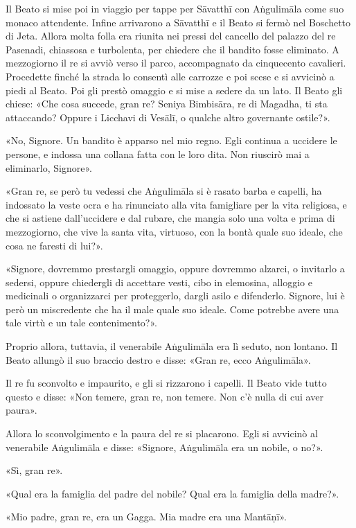 Il Beato si mise poi in viaggio per tappe per Sāvatthī con Aṅgulimāla come suo
monaco attendente. Infine arrivarono a Sāvatthī e il Beato si fermò nel
Boschetto di Jeta. Allora molta folla era riunita nei pressi del cancello del
palazzo del re Pasenadi, chiassosa e turbolenta, per chiedere che il bandito
fosse eliminato. A mezzogiorno il re si avviò verso il parco, accompagnato da
cinquecento cavalieri. Procedette finché la strada lo consentì alle carrozze e
poi scese e si avvicinò a piedi al Beato. Poi gli prestò omaggio e si mise a
sedere da un lato. Il Beato gli chiese: «Che cosa succede, gran re? Seniya
Bimbisāra, re di Magadha, ti sta attaccando? Oppure i Licchavi di Vesālī, o
qualche altro governante ostile?».

«No, Signore. Un bandito è apparso nel mio regno. Egli continua a uccidere le
persone, e indossa una collana fatta con le loro dita. Non riuscirò mai a
eliminarlo, Signore».

«Gran re, se però tu vedessi che Aṅgulimāla si è rasato barba e capelli, ha
indossato la veste ocra e ha rinunciato alla vita famigliare per la vita
religiosa, e che si astiene dall’uccidere e dal rubare, che mangia solo una
volta e prima di mezzogiorno, che vive la santa vita, virtuoso, con la bontà
quale suo ideale, che cosa ne faresti di lui?».

«Signore, dovremmo prestargli omaggio, oppure dovremmo alzarci, o invitarlo a
sedersi, oppure chiedergli di accettare vesti, cibo in elemosina, alloggio e
medicinali o organizzarci per proteggerlo, dargli asilo e difenderlo. Signore,
lui è però un miscredente che ha il male quale suo ideale. Come potrebbe avere
una tale virtù e un tale contenimento?».

Proprio allora, tuttavia, il venerabile Aṅgulimāla era lì seduto, non lontano.
Il Beato allungò il suo braccio destro e disse: «Gran re, ecco Aṅgulimāla».

Il re fu sconvolto e impaurito, e gli si rizzarono i capelli. Il Beato vide
tutto questo e disse: «Non temere, gran re, non temere. Non c’è nulla di cui
aver paura».

Allora lo sconvolgimento e la paura del re si placarono. Egli si avvicinò al
venerabile Aṅgulimāla e disse: «Signore, Aṅgulimāla era un nobile, o no?».

«Sì, gran re».

«Qual era la famiglia del padre del nobile? Qual era la famiglia della madre?».

«Mio padre, gran re, era un Gagga. Mia madre era una Mantāṇī».

